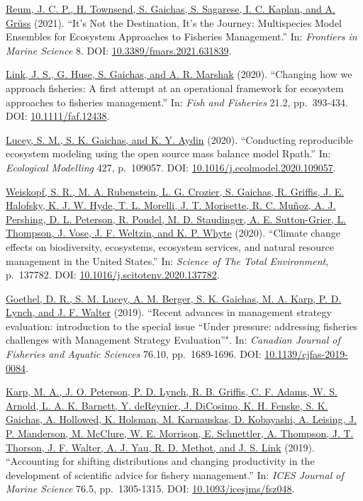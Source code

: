 \documentclass[11pt, a4paper]{awesome-cv}
\begin{document}
\protect\hyperlink{cite-reum_its_2021}{Reum, J. C. P., H. Townsend, S.
Gaichas, S. Sagarese, I. C. Kaplan, and A. Grüss} (2021). ``It's Not the
Destination, It's the Journey: Multispecies Model Ensembles for
Ecosystem Approaches to Fisheries Management.'' In: \emph{Frontiers in
Marine Science} 8. DOI:
\href{https://doi.org/10.3389\%2Ffmars.2021.631839}{10.3389/fmars.2021.631839}.

\protect\hyperlink{cite-link_changing_2020}{Link, J. S., G. Huse, S.
Gaichas, and A. R. Marshak} (2020). ``Changing how we approach
fisheries: A first attempt at an operational framework for ecosystem
approaches to fisheries management.'' In: \emph{Fish and Fisheries}
21.2, pp.~393-434. DOI:
\href{https://doi.org/10.1111\%2Ffaf.12438}{10.1111/faf.12438}.

\protect\hyperlink{cite-lucey_conducting_2020}{Lucey, S. M., S. K.
Gaichas, and K. Y. Aydin} (2020). ``Conducting reproducible ecosystem
modeling using the open source mass balance model Rpath.'' In:
\emph{Ecological Modelling} 427, p.~109057. DOI:
\href{https://doi.org/10.1016\%2Fj.ecolmodel.2020.109057}{10.1016/j.ecolmodel.2020.109057}.

\protect\hyperlink{cite-weiskopf_climate_2020}{Weiskopf, S. R., M. A.
Rubenstein, L. G. Crozier, S. Gaichas, R. Griffis, J. E. Halofsky, K. J.
W. Hyde, T. L. Morelli, J. T. Morisette, R. C. Muñoz, A. J. Pershing, D.
L. Peterson, R. Poudel, M. D. Staudinger, A. E. Sutton-Grier, L.
Thompson, J. Vose, J. F. Weltzin, and K. P. Whyte} (2020). ``Climate
change effects on biodiversity, ecosystems, ecosystem services, and
natural resource management in the United States.'' In: \emph{Science of
The Total Environment}, p.~137782. DOI:
\href{https://doi.org/10.1016\%2Fj.scitotenv.2020.137782}{10.1016/j.scitotenv.2020.137782}.

\protect\hyperlink{cite-goethel_recent_2019}{Goethel, D. R., S. M.
Lucey, A. M. Berger, S. K. Gaichas, M. A. Karp, P. D. Lynch, and J. F.
Walter} (2019). ``Recent advances in management strategy evaluation:
introduction to the special issue ``Under pressure: addressing fisheries
challenges with Management Strategy Evaluation''". In: \emph{Canadian
Journal of Fisheries and Aquatic Sciences} 76.10, pp.~1689-1696. DOI:
\href{https://doi.org/10.1139\%2Fcjfas-2019-0084}{10.1139/cjfas-2019-0084}.

\protect\hyperlink{cite-karp_accounting_2019}{Karp, M. A., J. O.
Peterson, P. D. Lynch, R. B. Griffis, C. F. Adams, W. S. Arnold, L. A.
K. Barnett, Y. deReynier, J. DiCosimo, K. H. Fenske, S. K. Gaichas, A.
Hollowed, K. Holsman, M. Karnauskas, D. Kobayashi, A. Leising, J. P.
Manderson, M. McClure, W. E. Morrison, E. Schnettler, A. Thompson, J. T.
Thorson, J. F. Walter, A. J. Yau, R. D. Methot, and J. S. Link} (2019).
``Accounting for shifting distributions and changing productivity in the
development of scientific advice for fishery management.'' In:
\emph{ICES Journal of Marine Science} 76.5, pp.~1305-1315. DOI:
\href{https://doi.org/10.1093\%2Ficesjms\%2Ffsz048}{10.1093/icesjms/fsz048}.
\end{document}
